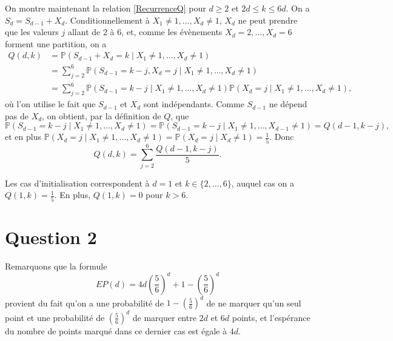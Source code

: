 \documentclass[a4paper,11pt]{amsart}
\theoremstyle{plain}
\begin{document}
On montre maintenant la relation \eqref{RecurrenceQ} pour $d \geq 2$ et $2d \leq k \leq 6d$. On a $S_d = S_{d-1} + X_d$. Conditionnellement à $X_1 \neq 1, \dotsc, X_d \neq 1$, $X_d$ ne peut prendre que les valeurs $j$ allant de $2$ à $6$, et, comme les évènements $X_d = 2, \dotsc, X_d = 6$ forment une partition, on a
\begin{align*}
Q(d, k) & = \mathbb P(S_{d-1} + X_d = k \mid X_1 \neq 1, \dotsc, X_d \neq 1) \\
& = \sum_{j=2}^6 \mathbb P(S_{d-1} = k-j, X_d = j \mid X_1 \neq 1, \dotsc, X_d \neq 1) \\
& = \sum_{j=2}^6 \mathbb P(S_{d-1} = k-j \mid X_1 \neq 1, \dotsc, X_d \neq 1)\mathbb P(X_d = j \mid X_1 \neq 1, \dotsc, X_d \neq 1),
\end{align*}
où l'on utilise le fait que $S_{d-1}$ et $X_d$ sont indépendants. Comme $S_{d-1}$ ne dépend pas de $X_d$, on obtient, par la définition de $Q$, que
\[\mathbb P(S_{d-1} = k-j \mid X_1 \neq 1, \dotsc, X_d \neq 1) = \mathbb P(S_{d-1} = k-j \mid X_1 \neq 1, \dotsc, X_{d-1} \neq 1) = Q(d-1, k-j),\]
et en plus $\mathbb P(X_d = j \mid X_1 \neq 1, \dotsc, X_d \neq 1) = \mathbb P(X_d = j \mid X_d \neq 1) = \frac{1}{5}$. Donc
\begin{equation*}
Q(d, k) = \sum_{j=2}^6 \frac{Q(d-1, k-j)}{5}.
\end{equation*}

Les cas d'initialisation correspondent à $d = 1$ et $k \in \{2, \dotsc, 6\}$, auquel cas on a $Q(1, k) = \frac{1}{5}$. En plus, $Q(1, k) = 0$ pour $k > 6$.

\section{Question 2}

Remarquons que la formule 
\begin{equation}
\label{EPd}
EP(d) = 4 d \left(\frac{5}{6}\right)^d + 1 - \left(\frac{5}{6}\right)^d
\end{equation}
provient du fait qu'on a une probabilité de $1 - \left(\frac{5}{6}\right)^d$ de ne marquer qu'un seul point et une probabilité de $\left(\frac{5}{6}\right)^d$ de marquer entre $2d$ et $6d$ points, et l'espérance du nombre de points marqué dans ce dernier cas est égale à $4d$.
\end{document}
